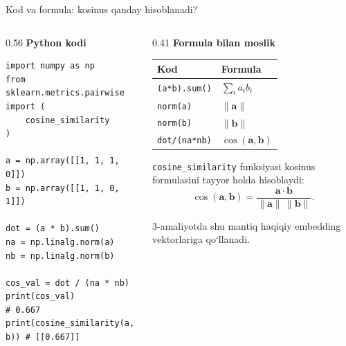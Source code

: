 \documentclass[aspectratio=169,11pt]{beamer}
\begin{document}
\begin{frame}[fragile]{Kod va formula: kosinus qanday hisoblanadi?}
\scriptsize

\begin{columns}[T,totalwidth=1.02\textwidth]
\begin{column}{0.56\textwidth}
\textbf{Python kodi}

\vspace{2pt}
\begin{tcolorbox}[defbox,left=2mm,right=2mm,top=1mm,bottom=1mm]
\begin{verbatim}
import numpy as np
from sklearn.metrics.pairwise import (
    cosine_similarity
)

a = np.array([[1, 1, 1, 0]])
b = np.array([[1, 1, 0, 1]])

dot = (a * b).sum()
na = np.linalg.norm(a)
nb = np.linalg.norm(b)

cos_val = dot / (na * nb)
print(cos_val)                 # 0.667
print(cosine_similarity(a, b)) # [[0.667]]
\end{verbatim}
\end{tcolorbox}
\end{column}

\begin{column}{0.41\textwidth}
\textbf{Formula bilan moslik}

\vspace{3pt}
\begin{tabular}{@{}l l@{}}
\toprule
\textbf{Kod} & \textbf{Formula} \\
\midrule
\texttt{(a*b).sum()} & $\sum_i a_i b_i$ \\
\texttt{norm(a)} & $\|\mathbf{a}\|$ \\
\texttt{norm(b)} & $\|\mathbf{b}\|$ \\
\texttt{dot/(na*nb)} & $\cos(\mathbf{a},\mathbf{b})$ \\
\bottomrule
\end{tabular}

\vspace{6pt}

\begin{tcolorbox}[defbox,left=2mm,right=2mm,top=1mm,bottom=1mm]
\footnotesize
\texttt{cosine\_similarity} funksiyasi kosinus formulasini tayyor holda hisoblaydi:
\[
\cos(\mathbf{a},\mathbf{b})=
\frac{\mathbf{a}\cdot\mathbf{b}}
{\|\mathbf{a}\|\,\|\mathbf{b}\|}.
\]
\end{tcolorbox}

\vspace{2pt}
\footnotesize
3-amaliyotda shu mantiq haqiqiy embedding vektorlariga qo‘llanadi.
\end{column}
\end{columns}

\end{frame}
\end{document}
